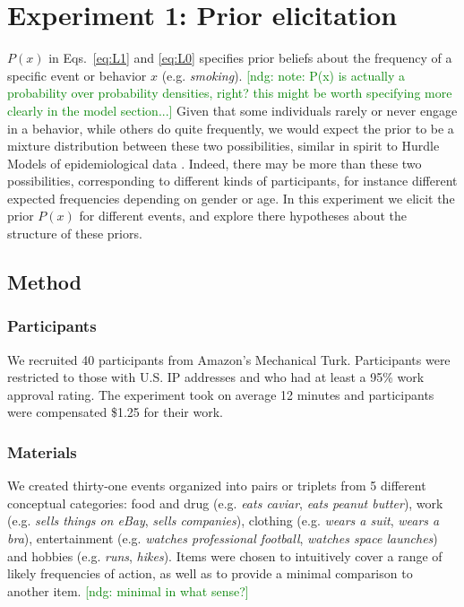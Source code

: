 \documentclass[10pt,letterpaper]{article}
\newcommand{\ndg}[1]{\textcolor{Green}{[ndg: #1]}}
\begin{document}
\section{Experiment 1: Prior elicitation}

%
$P(x)$ in Eqs.~\ref{eq:L1} and \ref{eq:L0} specifies prior beliefs about the frequency of a specific event or behavior $x$  (e.g. \emph{smoking}).
\ndg{note: P(x) is actually a probability over probability densities, right? this might be worth specifying more clearly in the model section...}
Given that some individuals rarely or never engage in a behavior, while others do quite frequently, we would expect the prior to be a mixture distribution between these two possibilities, similar in spirit to Hurdle Models of epidemiological data \cite{hurdleModels}.
Indeed, there may be more than these two possibilities, corresponding to different kinds of participants, for instance different expected frequencies depending on gender or age. 
In this experiment we elicit the prior $P(x)$ for different events, and explore there hypotheses about the structure of these priors.

\subsection{Method}

\subsubsection{Participants}
We recruited 40 participants from Amazon's Mechanical Turk.
Participants were restricted to those with U.S. IP addresses and who had at least a 95\% work approval rating.
The experiment took on average 12 minutes and participants were compensated \$1.25 for their work.

\subsubsection{Materials}

We created thirty-one events organized into pairs or triplets from 5 different conceptual categories: food and drug (e.g. \emph{eats caviar}, \emph{eats peanut butter}), work (e.g. \emph{sells things on eBay}, \emph{sells companies}), clothing (e.g. \emph{wears a suit}, \emph{wears a bra}), entertainment (e.g. \emph{watches professional football}, \emph{watches space launches}) and hobbies (e.g. \emph{runs}, \emph{hikes}). 
Items were chosen to intuitively cover a range of likely frequencies of action, as well as to provide a minimal comparison to another item. \ndg{minimal in what sense?}
\end{document}
